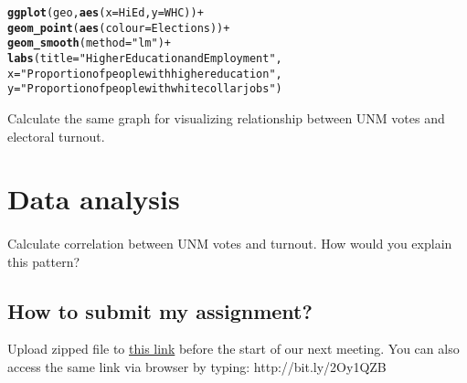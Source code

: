 \documentclass{article}\usepackage[]{graphicx}\usepackage[]{color}
\makeatletter
\newcommand{\hlstr}[1]{\textcolor[rgb]{0.192,0.494,0.8}{#1}}%
\newcommand{\hlopt}[1]{\textcolor[rgb]{0,0,0}{#1}}%
\newcommand{\hlstd}[1]{\textcolor[rgb]{0.345,0.345,0.345}{#1}}%
\newcommand{\hlkwc}[1]{\textcolor[rgb]{0.333,0.667,0.333}{#1}}%
\newcommand{\hlkwd}[1]{\textcolor[rgb]{0.737,0.353,0.396}{\textbf{#1}}}%
\newenvironment{kframe}{%
 \def\at@end@of@kframe{}%
 \ifinner\ifhmode%
  \def\at@end@of@kframe{\end{minipage}}%
  \begin{minipage}{\columnwidth}%
 \fi\fi%
 \def\FrameCommand##1{\hskip\@totalleftmargin \hskip-\fboxsep
 \colorbox{shadecolor}{##1}\hskip-\fboxsep
     \hskip-\linewidth \hskip-\@totalleftmargin \hskip\columnwidth}%
 \MakeFramed {\advance\hsize-\width
   \@totalleftmargin\z@ \linewidth\hsize
   \@setminipage}}%
 {\par\unskip\endMakeFramed%
 \at@end@of@kframe}
\newenvironment{knitrout}{}{} %
\makeatother
\begin{document}
\begin{knitrout}
\color{fgcolor}\begin{kframe}
\begin{alltt}
\hlkwd{ggplot}\hlstd{(geo,} \hlkwd{aes}\hlstd{(}\hlkwc{x}\hlstd{=HiEd,} \hlkwc{y}\hlstd{=WHC))}\hlopt{+}
  \hlkwd{geom_point}\hlstd{(}\hlkwd{aes}\hlstd{(}\hlkwc{colour}\hlstd{=Elections))}\hlopt{+}
  \hlkwd{geom_smooth}\hlstd{(}\hlkwc{method}\hlstd{=}\hlstr{"lm"}\hlstd{)}\hlopt{+}
  \hlkwd{labs}\hlstd{(}\hlkwc{title}\hlstd{=}\hlstr{"Higher Education and Employment"}\hlstd{,}
       \hlkwc{x}\hlstd{=}\hlstr{"Proportion of people with higher education"}\hlstd{,}
       \hlkwc{y} \hlstd{=}\hlstr{"Proportion of people with white collar jobs"}\hlstd{)}
\end{alltt}
\end{kframe}
\end{knitrout}

Calculate the same graph for visualizing relationship between UNM votes and electoral turnout.

\section*{Data analysis}
\paragraph{}

Calculate correlation between UNM votes and turnout. How would you explain this pattern?



\subsection*{How to submit my assignment?}

Upload zipped file to  \href{https://www.dropbox.com/request/nGci1X8XWd9eKWE5alp2}{this link} before the start of our next meeting. You can also access the same link via browser by typing: http://bit.ly/2Oy1QZB
\end{document}
